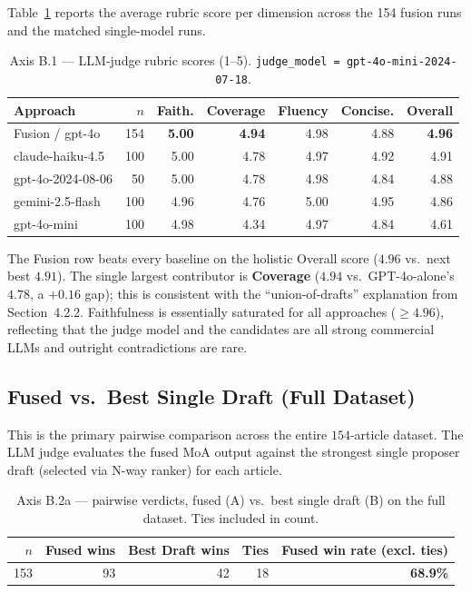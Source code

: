 Table~\ref{tab:axisB1} reports the average rubric score per dimension
across the 154 fusion runs and the matched single-model runs.

\begin{table}[H]
  \centering
  \caption{Axis B.1 --- LLM-judge rubric scores (1--5).
  \texttt{judge\_model = gpt-4o-mini-2024-07-18}.}
  \label{tab:axisB1}
  \begin{tabular}{lrrrrrr}
    \toprule
    Approach & $n$ & Faith. & Coverage & Fluency & Concise. & Overall \\
    \midrule
    Fusion / gpt-4o        & 154 & \textbf{5.00} & \textbf{4.94} & 4.98 & 4.88 & \textbf{4.96} \\
    claude-haiku-4.5       & 100 & 5.00 & 4.78 & 4.97 & 4.92 & 4.91 \\
    gpt-4o-2024-08-06      & 50  & 5.00 & 4.78 & 4.98 & 4.84 & 4.88 \\
    gemini-2.5-flash       & 100 & 4.96 & 4.76 & 5.00 & 4.95 & 4.86 \\
    gpt-4o-mini            & 100 & 4.98 & 4.34 & 4.97 & 4.84 & 4.61 \\
    \bottomrule
  \end{tabular}
\end{table}

The Fusion row beats every baseline on the holistic Overall score
($4.96$ vs.\ next best $4.91$). The single largest contributor is
\textbf{Coverage} ($4.94$ vs.\ GPT-4o-alone's $4.78$, a $+0.16$ gap);
this is consistent with the ``union-of-drafts'' explanation from
Section~4.2.2. Faithfulness is essentially saturated for all approaches
($\geq 4.96$), reflecting that the judge model and the candidates are
all strong commercial LLMs and outright contradictions are rare.

\subsection{Fused vs.\ Best Single Draft (Full Dataset)}

This is the primary pairwise comparison across the entire $154$-article dataset. The LLM judge evaluates the fused MoA output against the strongest single proposer draft (selected via N-way ranker) for each article.

\begin{table}[H]
  \centering
  \caption{Axis B.2a --- pairwise verdicts, fused (A) vs.\ best single draft (B) on the full dataset. Ties included in count.}
  \label{tab:axisB2a}
  \begin{tabular}{rrrrr}
    \toprule
    $n$ & Fused wins & Best Draft wins & Ties & Fused win rate (excl. ties) \\
    \midrule
    153 & 93 & 42 & 18 & \textbf{68.9\%} \\
    \bottomrule
  \end{tabular}
\end{table}

